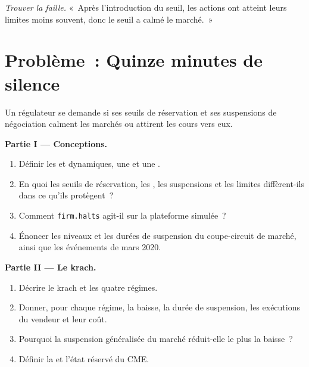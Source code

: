 \begin{exercise}[$\star\star\star$]\label{exo:mx:circuit-breakers-and-halts:8}
\emph{Trouver la faille.} «~Après l'introduction du seuil, les actions ont atteint leurs limites moins souvent, donc le seuil a calmé le marché.~»
\end{exercise}

\section{Problème~: Quinze minutes de silence}

\begin{problem}\label{pb:mx:circuit-breakers-and-halts:1}
Un régulateur se demande si ses seuils de réservation et ses suspensions de négociation calment les marchés ou attirent les cours vers eux.

\medskip\noindent\textbf{Partie I --- Conceptions.}
\begin{enumerate}
\item Définir les  et dynamiques, une  et une .
\item En quoi les seuils de réservation, les , les suspensions et les limites diffèrent-ils dans ce qu'ils protègent~?
\item Comment \texttt{firm.halts} agit-il sur la plateforme simulée~?
\item Énoncer les niveaux et les durées de suspension du coupe-circuit de marché, ainsi que les événements de mars 2020.
\end{enumerate}

\medskip\noindent\textbf{Partie II --- Le krach.}
\begin{enumerate}[resume]
\item Décrire le krach et les quatre régimes.
\item Donner, pour chaque régime, la baisse, la durée de suspension, les exécutions du vendeur et leur coût.
\item Pourquoi la suspension généralisée du marché réduit-elle le plus la baisse~?
\item Définir la  et l'état réservé du CME.
\end{enumerate}


\end{problem}
